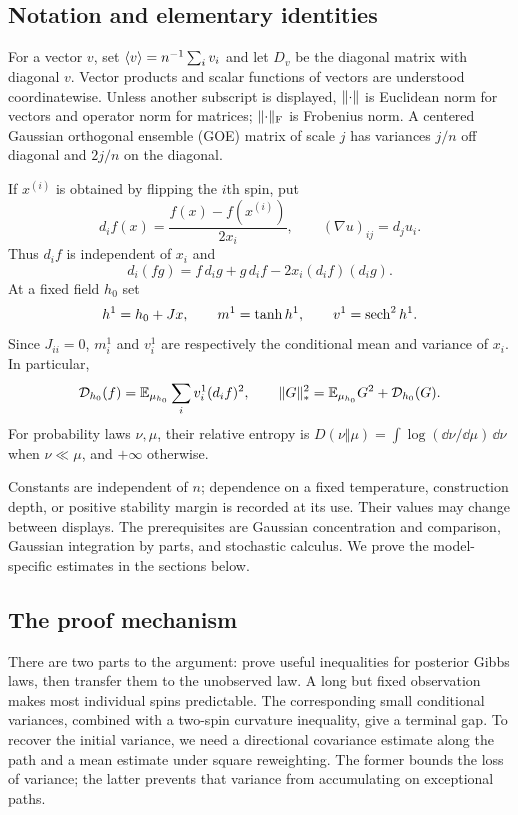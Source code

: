 \subsection{Notation and elementary identities}
For a vector $v$, set $\langle v\rangle=n^{-1}\sum_i v_i$ and let $D_v$ be the diagonal
matrix with diagonal $v$. Vector products and scalar functions of vectors are
understood coordinatewise. Unless another subscript is displayed, $\lVert \cdot\rVert$
is Euclidean norm for vectors and operator norm for matrices;
$\lVert \cdot\rVert_{\mathrm F}$ is Frobenius norm. A centered Gaussian orthogonal ensemble (GOE) matrix of scale $j$
has variances $j/n$ off diagonal and $2j/n$ on the diagonal.

If $x^{(i)}$ is obtained by flipping the $i$th spin, put
\[
 d_i f(x)=\frac{f(x)-f(x^{(i)})}{2x_i},\qquad
 (\nabla u)_{ij}=d_j u_i.
\]
Thus $d_i f$ is independent of $x_i$ and
\begin{equation}\label{eq:discrete-product}
 d_i(fg)=f\,d_i g+g\,d_i f-2x_i(d_i f)(d_i g).
\end{equation}
At a fixed field $h_0$ set
\[
 h^1=h_0+Jx,\qquad m^1=\tanh h^1,\qquad v^1=\operatorname{sech}^2 h^1.
\]
Since $J_{ii}=0$, $m_i^1$ and $v_i^1$ are respectively the conditional mean
and variance of $x_i$. In particular,
\begin{equation}\label{eq:dirichlet-gradient}
 \mathcal D_{h_0}(f)=\mathbb E_{\mu_{h_0}}\sum_i v_i^1(d_i f)^2,\qquad
 \lVert G\rVert_*^2=\mathbb E_{\mu_{h_0}}G^2+\mathcal D_{h_0}(G).
\end{equation}
For probability laws $\nu,\mu$, their relative entropy is
$D(\nu\Vert\mu)=\int\log(\dd\nu/\dd\mu)\,\dd\nu$ when $\nu\ll\mu$,
and $+\infty$ otherwise.

Constants are independent of $n$; dependence on a fixed temperature,
construction depth, or positive stability margin is recorded at its use.
Their values may change between displays. The prerequisites are Gaussian
concentration and comparison, Gaussian integration by parts, and stochastic
calculus. We prove the model-specific estimates in the sections below.

\subsection{The proof mechanism}
There are two parts to the argument: prove useful inequalities for
posterior Gibbs laws, then transfer them to the unobserved law. A long but
fixed observation makes most individual spins predictable. The corresponding
small conditional variances, combined with a two-spin curvature inequality,
give a terminal gap. To recover the initial variance, we need a directional
covariance estimate along the path and a mean estimate under square
reweighting. The former bounds the loss of variance; the latter prevents
that variance from accumulating on exceptional paths.

